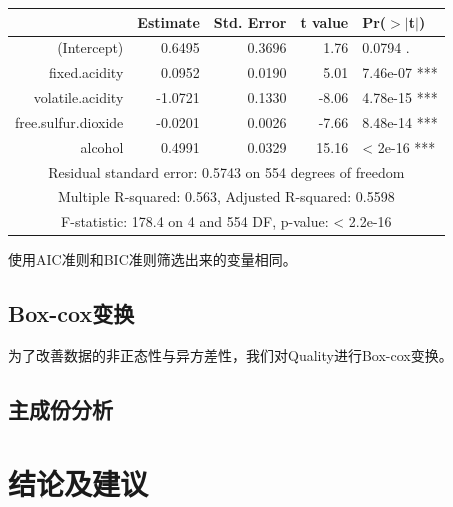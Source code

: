 \documentclass[fontset=ubuntu]{ctexart}
\begin{document}
                \begin{table}[ht]
                    \centering
                    \begin{tabular}{rrrrl}
                        \hline
                        & Estimate & Std. Error & t value & Pr($>$$|$t$|$) \\ 
                        \hline
                        (Intercept) & 0.6495 & 0.3696 & 1.76 & 0.0794 . \\ 
                        fixed.acidity & 0.0952 & 0.0190 & 5.01 & 7.46e-07 *** \\ 
                        volatile.acidity & -1.0721 & 0.1330 & -8.06 & 4.78e-15 *** \\ 
                        free.sulfur.dioxide & -0.0201 & 0.0026 & -7.66 & 8.48e-14 *** \\ 
                        alcohol & 0.4991 & 0.0329 & 15.16 & < 2e-16 *** \\ 
                        \hline
                        \multicolumn{5}{c}{Residual standard error: 0.5743 on 554 degrees of freedom} \\
                        \multicolumn{5}{c}{Multiple R-squared:  0.563,	Adjusted R-squared:  0.5598 } \\
                        \multicolumn{5}{c}{F-statistic: 178.4 on 4 and 554 DF,  p-value: < 2.2e-16} \\
                        \hline
                    \end{tabular}
                \end{table}

                使用AIC准则和BIC准则筛选出来的变量相同。

        \subsection{Box-cox变换}
            为了改善数据的非正态性与异方差性，我们对Quality进行Box-cox变换。
            
        \subsection{主成份分析}
    \section{结论及建议}

    \newpage
\end{document}
